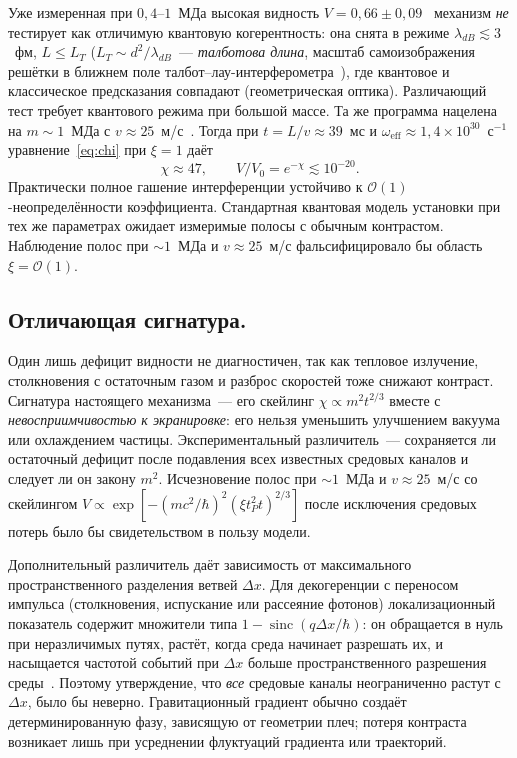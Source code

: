 \documentclass[12pt,a4paper]{article}
\begin{document}
Уже измеренная при $0{,}4$--$1$~МДа высокая видность $V=0{,}66\pm0{,}09$~\cite{arndt2025} механизм \emph{не} тестирует как отличимую квантовую когерентность: она снята в режиме $\lambda_{dB}\lesssim3$~фм, $L\le L_T$ ($L_T\sim d^2/\lambda_{dB}$~--- \emph{талботова длина}, масштаб самоизображения решётки в ближнем поле талбот--лау-интерферометра~\cite{arndt2025,kialka2022}), где квантовое и классическое предсказания совпадают (геометрическая оптика). Различающий тест требует квантового режима при большой массе. Та же программа нацелена на $m\sim 1$~МДа с $v\approx 25$~м/с~\cite{arndt2025}. Тогда при $t=L/v\approx 39$~мс и $\omega_{\mathrm{eff}}\approx 1{,}4\times10^{30}$~с$^{-1}$ уравнение~\eqref{eq:chi} при $\xi=1$ даёт
\begin{equation}
\chi\approx 47,
\qquad
V/V_0=e^{-\chi}\lesssim 10^{-20}.
\end{equation}
Практически полное гашение интерференции устойчиво к $\mathcal O(1)$-неопределённости коэффициента. Стандартная квантовая модель установки при тех же параметрах ожидает измеримые полосы с обычным контрастом. Наблюдение полос при $\sim\!1$~МДа и $v\approx25$~м/с фальсифицировало бы область $\xi=\mathcal O(1)$.

\subsection{Отличающая сигнатура.}
\label{sec:signature}

Один лишь дефицит видности не диагностичен, так как тепловое излучение, столкновения с остаточным газом и разброс скоростей тоже снижают контраст. Сигнатура настоящего механизма~--- его скейлинг $\chi\propto m^2 t^{2/3}$ вместе с \emph{невосприимчивостью к экранировке}: его нельзя уменьшить улучшением вакуума или охлаждением частицы. Экспериментальный различитель~--- сохраняется ли остаточный дефицит после подавления всех известных средовых каналов и следует ли он закону $m^2$. Исчезновение полос при $\sim\!1$~МДа и $v\approx25$~м/с со скейлингом $V\propto\exp[-(mc^2/\hbar)^2(\xi t_P^2 t)^{2/3}]$ после исключения средовых потерь было бы свидетельством в пользу модели.

Дополнительный различитель даёт зависимость от максимального пространственного разделения ветвей $\Delta x$. Для декогеренции с переносом импульса (столкновения, испускание или рассеяние фотонов) локализационный показатель содержит множители типа $1-\operatorname{sinc}(q\Delta x/\hbar)$: он обращается в нуль при неразличимых путях, растёт, когда среда начинает разрешать их, и насыщается частотой событий при $\Delta x$ больше пространственного разрешения среды~\cite{hornberger2004tli}. Поэтому утверждение, что \emph{все} средовые каналы неограниченно растут с $\Delta x$, было бы неверно. Гравитационный градиент обычно создаёт детерминированную фазу, зависящую от геометрии плеч; потеря контраста возникает лишь при усреднении флуктуаций градиента или траекторий.
\end{document}
